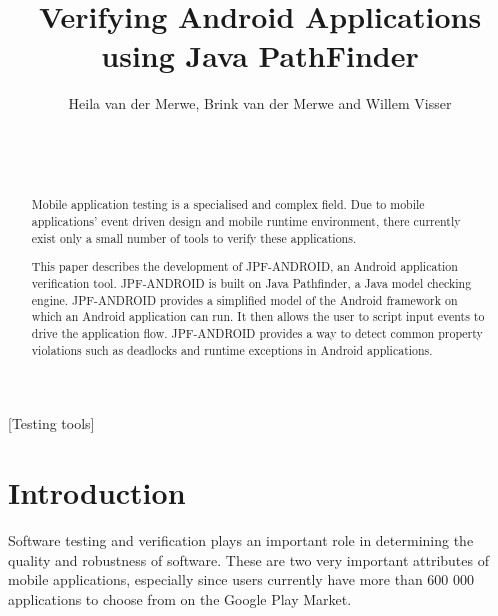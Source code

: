 \documentclass{acm_proc_article-sp}
\begin{document}
\title{Verifying Android Applications using Java PathFinder}


\author{%
\alignauthor Heila van der Merwe, Brink van der Merwe and Willem Visser\\
       \\
       \\
       \\
}

\maketitle

\begin{abstract}
Mobile application testing is a specialised and complex field. Due to mobile applications' event driven design and mobile runtime
environment, there currently exist only a small number of tools to verify these applications.

This paper describes the development of JPF-ANDROID, an Android application verification tool. JPF-ANDROID is built on Java Pathfinder, 
a Java model checking engine. JPF-ANDROID provides a simplified model of the Android framework on which an Android application can run. It then allows
the user to script input events to drive the application flow. JPF-ANDROID provides a way to detect common property violations such as deadlocks and runtime exceptions
in Android applications.
\end{abstract}

[Testing tools]



\section{Introduction}
Software testing and verification plays an important role in determining the quality and robustness of software. These are two very
important attributes of mobile applications, especially since users currently have more than 600 000 applications to choose from on the
Google Play Market.
\end{document}
